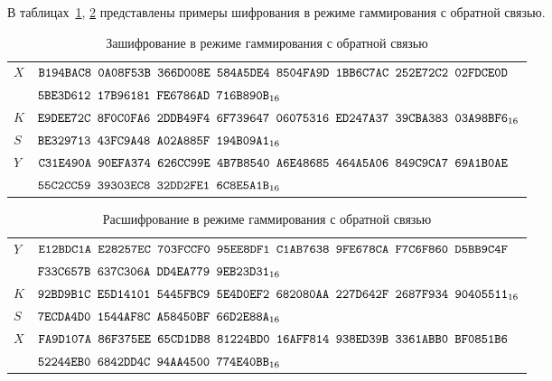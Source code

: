 \label{TEST.CFB}

В таблицах~\ref{Table.TEST.CFBE}, \ref{Table.TEST.CFBD} 
представлены примеры шифрования в режиме гаммирования с обратной связью.

\begin{table}[H]
\caption{Зашифрование в режиме гаммирования с обратной связью}\label{Table.TEST.CFBE}
\begin{tabular}{|l|l|}
\hline
$X$ &
$\texttt{B194BAC8~0A08F53B~366D008E~584A5DE4~8504FA9D~1BB6C7AC~252E72C2~02FDCE0D}$\\
&
$\texttt{5BE3D612~17B96181~FE6786AD~716B890B}_{16}$\\
\hline
$K$ & 
$\texttt{E9DEE72C~8F0C0FA6~2DDB49F4~6F739647~06075316~ED247A37~39CBA383~03A98BF6}_{16}$\\
\hline
$S$ & 
$\texttt{BE329713~43FC9A48~A02A885F~194B09A1}_{16}$\\
\dhline
$Y$ &
$\texttt{C31E490A~90EFA374~626CC99E~4B7B8540~A6E48685~464A5A06~849C9CA7~69A1B0AE}$\\
&
$\texttt{55C2CC59~39303EC8~32DD2FE1~6C8E5A1B}_{16}$\\
\hline
\end{tabular}
\end{table}

\begin{table}[H]
\caption{Расшифрование в режиме гаммирования с обратной связью}\label{Table.TEST.CFBD}
\begin{tabular}{|l|l|}
\hline
$Y$ &
$\texttt{E12BDC1A~E28257EC~703FCCF0~95EE8DF1~C1AB7638~9FE678CA~F7C6F860~D5BB9C4F}$\\
& 
$\texttt{F33C657B~637C306A~DD4EA779~9EB23D31}_{16}$\\
\hline
$K$ & 
$\texttt{92BD9B1C~E5D14101~5445FBC9~5E4D0EF2~682080AA~227D642F~2687F934~90405511}_{16}$\\
\hline
$S$ & 
$\texttt{7ECDA4D0~1544AF8C~A58450BF~66D2E88A}_{16}$\\
\dhline
$X$ &
$\texttt{FA9D107A~86F375EE~65CD1DB8~81224BD0~16AFF814~938ED39B~3361ABB0~BF0851B6}$\\
&
$\texttt{52244EB0~6842DD4C~94AA4500~774E40BB}_{16}$\\
\hline
\end{tabular}
\end{table}
